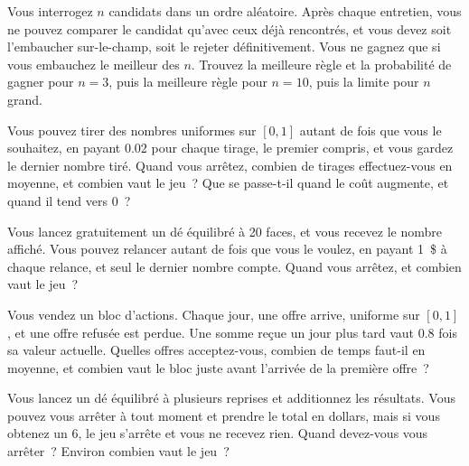 \begin{question}\label{iq:iv1:optimal-stopping:5}
Vous interrogez $n$ candidats dans un ordre aléatoire. Après chaque entretien, vous ne pouvez comparer le candidat qu'avec ceux déjà rencontrés, et vous devez soit l'embaucher sur-le-champ, soit le rejeter définitivement. Vous ne gagnez que si vous embauchez le meilleur des $n$. Trouvez la meilleure règle et la probabilité de gagner pour $n = 3$, puis la meilleure règle pour $n = 10$, puis la limite pour $n$ grand.
\end{question}

\begin{question}\label{iq:iv1:optimal-stopping:6}
Vous pouvez tirer des nombres uniformes sur $[0, 1]$ autant de fois que vous le souhaitez, en payant $0.02$ pour chaque tirage, le premier compris, et vous gardez le dernier nombre tiré. Quand vous arrêtez, combien de tirages effectuez-vous en moyenne, et combien vaut le jeu~? Que se passe-t-il quand le coût augmente, et quand il tend vers 0~?
\end{question}

\begin{question}\label{iq:iv1:optimal-stopping:7}
Vous lancez gratuitement un dé équilibré à 20 faces, et vous recevez le nombre affiché. Vous pouvez relancer autant de fois que vous le voulez, en payant 1~\$ à chaque relance, et seul le dernier nombre compte. Quand vous arrêtez, et combien vaut le jeu~?
\end{question}

\begin{question}\label{iq:iv1:optimal-stopping:8}
Vous vendez un bloc d'actions. Chaque jour, une offre arrive, uniforme sur $[0, 1]$, et une offre refusée est perdue. Une somme reçue un jour plus tard vaut $0.8$ fois sa valeur actuelle. Quelles offres acceptez-vous, combien de temps faut-il en moyenne, et combien vaut le bloc juste avant l'arrivée de la première offre~?
\end{question}

\begin{question}\label{iq:iv1:optimal-stopping:9}
Vous lancez un dé équilibré à plusieurs reprises et additionnez les résultats. Vous pouvez vous arrêter à tout moment et prendre le total en dollars, mais si vous obtenez un 6, le jeu s'arrête et vous ne recevez rien. Quand devez-vous vous arrêter~? Environ combien vaut le jeu~?
\end{question}

